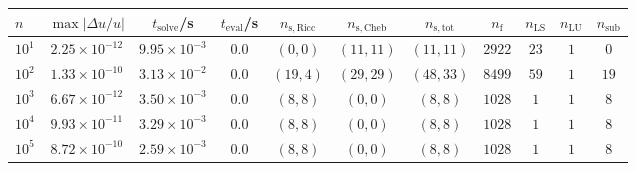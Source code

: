 \begin{tabular}{l c c c c c c c c c c}
\hline \hline 
$n$  &  $\max|\Delta u/u|$  &  $t_{\mathrm{solve}}$/\si{\s}  &  $t_{\mathrm{eval}}$/\si{\s}  &  $n_{\mathrm{s,Ricc}}$  &  $n_{\mathrm{s,Cheb}}$  &  $n_{\mathrm{s,tot}}$  &  $n_{\mathrm{f}}$  &  $n_{\mathrm{LS}}$  &  $n_{\mathrm{LU}}$  &  $n_{\mathrm{sub}}$ \\ \hline
    $10^1$  &  $2.25 \times 10^{-12}$  &  $9.95\times 10^{-3}$  &  $0.0$  &  $(0, 0)$  &  $(11, 11)$  &  $(11, 11)$  &  $2922$  &  $23$  &  $1$  &  $0$\\ 
    $10^2$  &  $1.33 \times 10^{-10}$  &  $3.13\times 10^{-2}$  &  $0.0$  &  $(19, 4)$  &  $(29, 29)$  &  $(48, 33)$  &  $8499$  &  $59$  &  $1$  &  $19$\\ 
    $10^3$  &  $6.67 \times 10^{-12}$  &  $3.50\times 10^{-3}$  &  $0.0$  &  $(8, 8)$  &  $(0, 0)$  &  $(8, 8)$  &  $1028$  &  $1$  &  $1$  &  $8$\\ 
    $10^4$  &  $9.93 \times 10^{-11}$  &  $3.29\times 10^{-3}$  &  $0.0$  &  $(8, 8)$  &  $(0, 0)$  &  $(8, 8)$  &  $1028$  &  $1$  &  $1$  &  $8$\\ 
    $10^5$  &  $8.72 \times 10^{-10}$  &  $2.59\times 10^{-3}$  &  $0.0$  &  $(8, 8)$  &  $(0, 0)$  &  $(8, 8)$  &  $1028$  &  $1$  &  $1$  &  $8$\\ 

\end{tabular}
